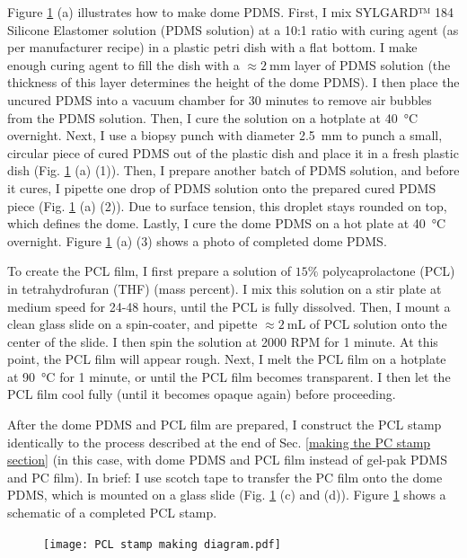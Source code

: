 \documentclass[double,12pt,1in]{beavtex}
\begin{document}
Figure \ref{PCL stamp making diagram} (a) illustrates how to make dome PDMS. First, I mix SYLGARD™ 184 Silicone Elastomer solution (PDMS solution) at a 10:1 ratio with curing agent (as per manufacturer recipe) in a plastic petri dish with a flat bottom. I make enough curing agent to fill the dish with a $\approx \SI{2}{\milli\meter}$ layer of PDMS solution (the thickness of this layer determines the height of the dome PDMS). I then place the uncured PDMS into a vacuum chamber for 30 minutes to remove air bubbles from the PDMS solution. Then, I cure the solution on a hotplate at \SI{40}{\celsius} overnight. Next, I use a biopsy punch with diameter \SI{2.5}{\milli\meter} to punch a small, circular piece of cured PDMS out of the plastic dish and place it in a fresh plastic dish (Fig. \ref{PCL stamp making diagram} (a) (1)). Then, I prepare another batch of PDMS solution, and before it cures, I pipette one drop of PDMS solution onto the prepared cured PDMS piece (Fig. \ref{PCL stamp making diagram} (a) (2)). Due to surface tension, this droplet stays rounded on top, which defines the dome. Lastly, I cure the dome PDMS on a hot plate at \SI{40}{\celsius} overnight. Figure \ref{PCL stamp making diagram} (a) (3) shows a photo of completed dome PDMS.

To create the PCL film, I first prepare a solution of $15 \%$ polycaprolactone (PCL) in tetrahydrofuran (THF) (mass percent). I mix this solution on a stir plate at medium speed for 24-48 hours, until the PCL is fully dissolved. Then, I mount a clean glass slide on a spin-coater, and pipette $\approx \SI{2}{\milli\liter}$ of PCL solution onto the center of the slide. I then spin the solution at 2000 RPM for 1 minute. At this point, the PCL film will appear rough. Next, I melt the PCL film on a hotplate at \SI{90}{\celsius} for 1 minute, or until the PCL film becomes transparent. I then let the PCL film cool fully (until it becomes opaque again) before proceeding.

After the dome PDMS and PCL film are prepared, I construct the PCL stamp identically to the process described at the end of Sec. \ref{making the PC stamp section} (in this case, with dome PDMS and PCL film instead of gel-pak PDMS and PC film). In brief: I use scotch tape to transfer the PC film onto the dome PDMS, which is mounted on a glass slide (Fig. \ref{PCL stamp making diagram} (c) and (d)). Figure \ref{PCL stamp making diagram} shows a schematic of a completed PCL stamp.

\begin{figure}
    \texttt{[image: PCL stamp making diagram.pdf]}
    \caption{}
    \label{PCL stamp making diagram}
\end{figure}
\end{document}
